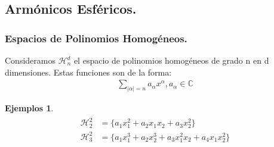 \documentclass{beamer}
\theoremstyle{plain}
\theoremstyle{definition}
\theoremstyle{plain}
\theoremstyle{definition}
\theoremstyle{remark}
\theoremstyle{definition}
\newtheorem{ejemplos}[thm]{Ejemplos}
\begin{document}
\subsection{Armónicos Esféricos.}
\begin{frame}
	\tableofcontents[currentsection,currentsubsection,sections=1]
\end{frame}
\begin{frame}
	\frametitle{Espacios de Polinomios Homogéneos.}
	Consideramos $\mathcal{H}^d_n$ el espacio de polinomios homogéneos de grado n en d dimensiones.
	Estas funciones son de la forma:
	\begin{gather*}
		\sum_{|\alpha|=n}a_\alpha x^\alpha, a_\alpha \in \mathds{C}
	\end{gather*}

	\begin{ejemplos}
		\begin{gather*}
		\begin{aligned}
		\mathcal{H}^2_2 &= \{ a_1x_1^2 + a_2x_1x_2 + a_3x_2^2\} \\
		\mathcal{H}^2_3 &= \{ a_1x_1^3 + a_2x_2^3 + a_3x_1^2x_2 + a_4x_1x_2^2 \}
		\end{aligned}
		\end{gather*}
	\end{ejemplos}
\end{frame}
\end{document}
